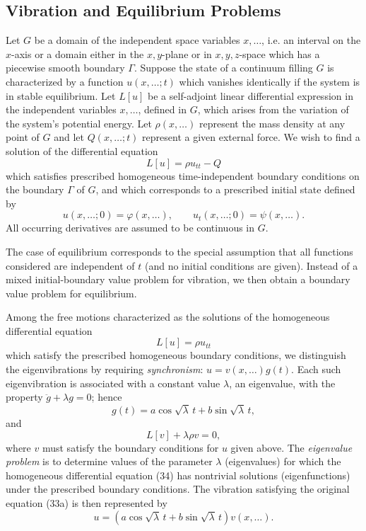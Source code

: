 \subsection{Vibration and Equilibrium Problems}
Let $G$ be a domain of the independent space variables $x,\ldots$, i.e. an interval on the $x$-axis or a domain either in the $x,y$-plane or in $x,y,z$-space which has a piecewise smooth boundary $\Gamma$. Suppose the state of a continuum filling $G$ is characterized by a function $u(x,\ldots;t)$ which vanishes identically if the system is in stable equilibrium. Let $L[u]$ be a self-adjoint linear differential expression in the independent variables $x,\ldots$, defined in $G$, which arises from the variation of the system's potential energy. Let $\rho(x,\ldots)$ represent the mass density at any point of $G$ and let $Q(x,\ldots;t)$ represent a given external force. We wish to find a solution of the differential equation
\begin{equation}\tag{33}
L[u]=\rho u_{tt}-Q
\end{equation}
which satisfies prescribed homogeneous time-independent boundary conditions on the boundary $\Gamma$ of $G$, and which corresponds to a prescribed initial state defined by
\[
u(x,\ldots;0)=\varphi(x,\ldots),
\qquad
u_t(x,\ldots;0)=\psi(x,\ldots).
\]
All occurring derivatives are assumed to be continuous in $G$.

The case of equilibrium corresponds to the special assumption that all functions considered are independent of $t$ (and no initial conditions are given). Instead of a mixed initial-boundary value problem for vibration, we then obtain a boundary value problem for equilibrium.

Among the free motions characterized as the solutions of the homogeneous differential equation
\begin{equation}\tag{33a}
L[u]=\rho u_{tt}
\end{equation}
which satisfy the prescribed homogeneous boundary conditions, we distinguish the eigenvibrations by requiring \emph{synchronism}: $u=v(x,\ldots)g(t)$. Each such eigenvibration is associated with a constant value $\lambda$, an eigenvalue, with the property $\ddot g+\lambda g=0$; hence
\[
g(t)=a\cos\sqrt\lambda\,t+b\sin\sqrt\lambda\,t,
\]
and
\begin{equation}\tag{34}
L[v]+\lambda\rho v=0,
\end{equation}
where $v$ must satisfy the boundary conditions for $u$ given above. The \emph{eigenvalue problem} is to determine values of the parameter $\lambda$ (eigenvalues) for which the homogeneous differential equation (34) has nontrivial solutions (eigenfunctions) under the prescribed boundary conditions. The vibration satisfying the original equation (33a) is then represented by
\[
u=(a\cos\sqrt\lambda\,t+b\sin\sqrt\lambda\,t)v(x,\ldots).
\]

